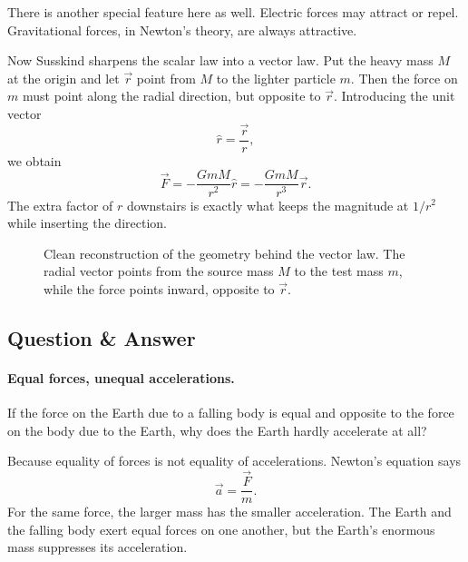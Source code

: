There is another special feature here as well. Electric forces may attract or repel. Gravitational forces, in Newton's theory, are always attractive.

Now Susskind sharpens the scalar law into a vector law. Put the heavy mass \(M\) at the origin and let \(\vec r\) point from \(M\) to the lighter particle \(m\). Then the force on \(m\) must point along the radial direction, but opposite to \(\vec r\). Introducing the unit vector
\begin{equation}
\hat r=\frac{\vec r}{r},
\end{equation}
we obtain
\begin{equation}
\vec F
=
-\frac{GmM}{r^2}\hat r
=
-\frac{GmM}{r^3}\vec r.
\end{equation}
The extra factor of \(r\) downstairs is exactly what keeps the magnitude at \(1/r^2\) while inserting the direction.

\begin{figure}
\centering
{}
\caption{Clean reconstruction of the geometry behind the vector law. The radial vector points from the source mass \(M\) to the test mass \(m\), while the force points inward, opposite to \(\vec r\).}
\end{figure}

\subsection{Question \& Answer}

\paragraph{Equal forces, unequal accelerations.}
If the force on the Earth due to a falling body is equal and opposite to the force on the body due to the Earth, why does the Earth hardly accelerate at all?

Because equality of forces is not equality of accelerations. Newton's equation says
\[
\vec a=\frac{\vec F}{m}.
\]
For the same force, the larger mass has the smaller acceleration. The Earth and the falling body exert equal forces on one another, but the Earth's enormous mass suppresses its acceleration.

